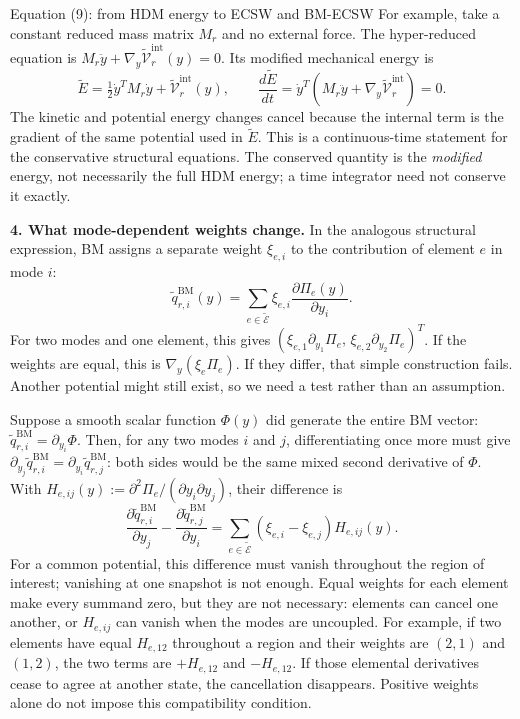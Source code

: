 \documentclass[a4paper,12pt]{article}
\begin{document}
\begin{lecturalarga}{Equation (9): from HDM energy to ECSW and BM-ECSW}
For example, take a constant reduced mass matrix $M_r$ and no external force. The hyper-reduced equation is $M_r\ddot y+\nabla_y\widetilde{\mathcal V}_r^{\mathrm{int}}(y)=0$. Its modified mechanical energy is
\[
  \widetilde E
  =\tfrac12\dot y^T M_r\dot y
   +\widetilde{\mathcal V}_r^{\mathrm{int}}(y),
  \qquad
  \frac{d\widetilde E}{dt}
  =\dot y^T\!\left(M_r\ddot y+
    \nabla_y\widetilde{\mathcal V}_r^{\mathrm{int}}\right)=0.
\]
The kinetic and potential energy changes cancel because the internal term is the gradient of the same potential used in $\widetilde E$. This is a continuous-time statement for the conservative structural equations. The conserved quantity is the \emph{modified} energy, not necessarily the full HDM energy; a time integrator need not conserve it exactly.

\smallskip\textbf{4. What mode-dependent weights change.} In the analogous structural expression, BM assigns a separate weight $\xi_{e,i}$ to the contribution of element $e$ in mode $i$:
\[
  \widetilde q_{r,i}^{\mathrm{BM}}(y)
  =\sum_{e\in\widetilde{\mathcal E}}\xi_{e,i}
    \frac{\partial\Pi_e(y)}{\partial y_i}.
\]
For two modes and one element, this gives $(\xi_{e,1}\partial_{y_1}\Pi_e,\,\xi_{e,2}\partial_{y_2}\Pi_e)^T$. If the weights are equal, this is $\nabla_y(\xi_e\Pi_e)$. If they differ, that simple construction fails. Another potential might still exist, so we need a test rather than an assumption.

Suppose a smooth scalar function $\Phi(y)$ did generate the entire BM vector: $\widetilde q_{r,i}^{\mathrm{BM}}=\partial_{y_i}\Phi$. Then, for any two modes $i$ and $j$, differentiating once more must give $\partial_{y_j}\widetilde q_{r,i}^{\mathrm{BM}}=\partial_{y_i}\widetilde q_{r,j}^{\mathrm{BM}}$: both sides would be the same mixed second derivative of $\Phi$. With $H_{e,ij}(y):=\partial^2\Pi_e/(\partial y_i\partial y_j)$, their difference is
\[
  \frac{\partial\widetilde q_{r,i}^{\mathrm{BM}}}{\partial y_j}
  -\frac{\partial\widetilde q_{r,j}^{\mathrm{BM}}}{\partial y_i}
  =\sum_{e\in\widetilde{\mathcal E}}
    (\xi_{e,i}-\xi_{e,j})H_{e,ij}(y).
\]
For a common potential, this difference must vanish throughout the region of interest; vanishing at one snapshot is not enough. Equal weights for each element make every summand zero, but they are not necessary: elements can cancel one another, or $H_{e,ij}$ can vanish when the modes are uncoupled. For example, if two elements have equal $H_{e,12}$ throughout a region and their weights are $(2,1)$ and $(1,2)$, the two terms are $+H_{e,12}$ and $-H_{e,12}$. If those elemental derivatives cease to agree at another state, the cancellation disappears. Positive weights alone do not impose this compatibility condition.


\end{lecturalarga}
\end{document}
